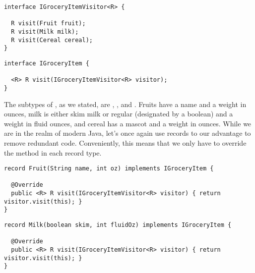 
\begin{cl}[]{}
\begin{lstlisting}[language=MyJava]
interface IGroceryItemVisitor<R> {

  R visit(Fruit fruit);
  R visit(Milk milk);
  R visit(Cereal cereal);
}
\end{lstlisting}
\end{cl}

\begin{cl}[]{}
\begin{lstlisting}[language=MyJava]
interface IGroceryItem {

  <R> R visit(IGroceryItemVisitor<R> visitor);
}
\end{lstlisting}
\end{cl}

The subtypes of , as we stated, are , , and . Fruits have a name and a weight in ounces, milk is either skim milk or regular (designated by a boolean) and a weight in fluid ounces, and cereal has a mascot and a weight in ounces. While we are in the realm of modern Java, let's once again use records to our advantage to remove redundant code. Conveniently, this means that we only have to override the  method in each record type.

\begin{cl}[]{}
\begin{lstlisting}[language=MyJava]
record Fruit(String name, int oz) implements IGroceryItem {

  @Override
  public <R> R visit(IGroceryItemVisitor<R> visitor) { return visitor.visit(this); }
}
\end{lstlisting}
\end{cl}

\begin{cl}[]{}
\begin{lstlisting}[language=MyJava]
record Milk(boolean skim, int fluidOz) implements IGroceryItem {
  
  @Override
  public <R> R visit(IGroceryItemVisitor<R> visitor) { return visitor.visit(this); }
}
\end{lstlisting}
\end{cl}

